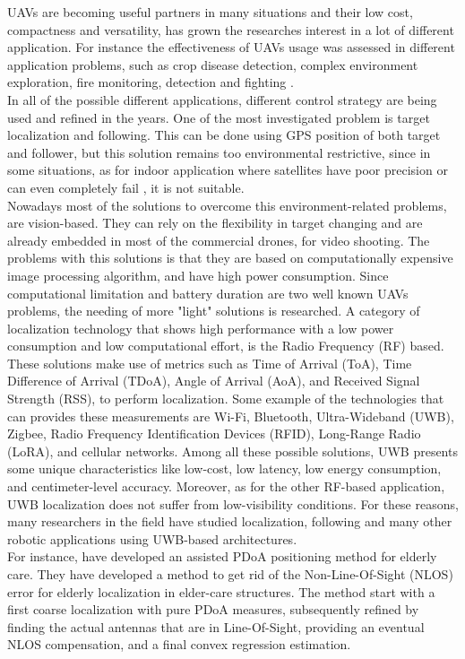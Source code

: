 UAVs are becoming useful partners in many situations and their low cost, compactness and versatility, has grown the researches interest in a lot of different application. For instance the effectiveness of UAVs usage was assessed in different application problems, such as crop disease detection\cite{cropdisdect}, complex environment exploration\cite{complenvexp}, fire monitoring, detection and fighting \cite{FireUAV}.\\
In all of the possible different applications, different control strategy are being used and refined in the years. One of the most investigated problem is target localization and following. This can be done using GPS position of both target and follower, but this solution remains too environmental restrictive, since in some situations, as for indoor application where satellites have poor precision or can even completely fail \cite{GPS-denied}, it is not suitable.\\
Nowadays most of the solutions to overcome this environment-related problems, are vision-based\cite{visualinertialrev}. They can rely on the flexibility in target changing and are already embedded in most of the commercial drones, for video shooting. The problems with this solutions is that they are based on computationally expensive image processing algorithm, and have high power consumption. Since computational limitation and battery duration are two well known UAVs problems\cite{UAVlimits}, the needing of more "light" solutions is researched.
A category of localization technology that shows high performance with a low power consumption and low computational effort, is the Radio Frequency (RF) based. These solutions make use of metrics such as Time of Arrival (ToA), Time Difference of Arrival (TDoA), Angle of Arrival (AoA), and Received Signal Strength (RSS), to perform localization. Some example of the technologies that can provides these measurements are Wi-Fi, Bluetooth, Ultra-Wideband (UWB), Zigbee, Radio Frequency Identification Devices (RFID), Long-Range Radio (LoRA), and cellular networks\cite{radiofreqloc}. Among all these possible solutions, UWB presents some unique characteristics like low-cost, low latency, low energy consumption, and centimeter-level accuracy. Moreover, as for the other RF-based application, UWB localization does not suffer from low-visibility conditions. For these reasons, many researchers in the field have studied localization, following and many other robotic applications using UWB-based architectures.\\
For instance, \citet{elderlycare} have developed an assisted PDoA positioning method for elderly care. They have developed a method to get rid of the Non-Line-Of-Sight (NLOS) error for elderly localization in elder-care structures. The method start with a first coarse localization with pure PDoA measures, subsequently refined by finding the actual antennas that are in Line-Of-Sight, providing an eventual NLOS compensation, and a final convex regression estimation.\\
